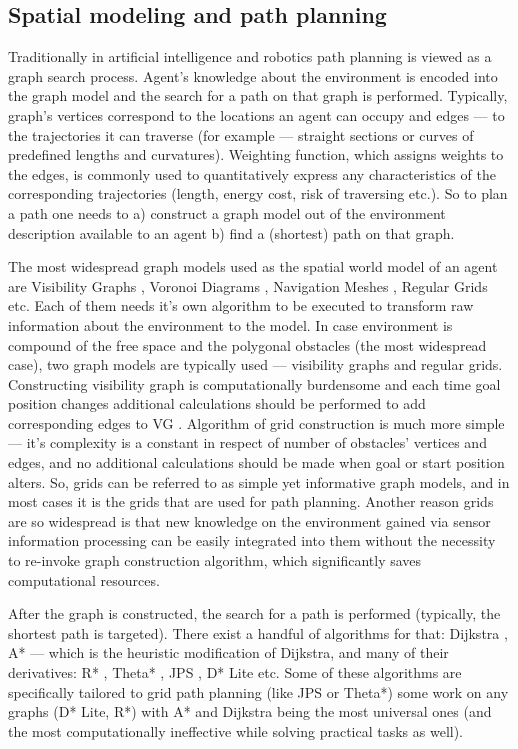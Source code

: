\documentclass[runningheads,a4paper]{llncs}
\begin{document}
\subsection{Spatial modeling and path planning}

Traditionally in artificial intelligence and robotics path planning is viewed as a graph search process. Agent's knowledge about the environment is encoded into the graph model and the search for a path on that graph is performed. Typically, graph's vertices correspond to the locations an agent can occupy and edges --- to the trajectories it can traverse (for example --- straight sections or curves of predefined lengths and curvatures). Weighting function, which assigns weights to the edges, is commonly used to quantitatively express any characteristics of the corresponding trajectories (length, energy cost, risk of traversing etc.). So to plan a path one needs to a) construct a graph model out of the environment description available to an agent b) find a (shortest) path on that graph.

The most widespread graph models used as the spatial world model of an agent are Visibility Graphs \cite{Lozano1979}, Voronoi Diagrams \cite{Bhattacharya2008}, Navigation Meshes \cite{Kallmann2010}, Regular Grids \cite{Yap2002} etc. Each of them needs it's own algorithm to be executed to transform raw information about the environment to the model. In case environment is compound of the free space and the polygonal obstacles (the most widespread case), two graph models are typically used --- visibility graphs and regular grids. Constructing visibility graph is computationally burdensome and each time goal position changes additional calculations should be performed to add corresponding edges to VG \cite{Wooden2006}. Algorithm of grid construction is much more simple --- it's complexity is a constant in respect of number of obstacles' vertices and edges, and no additional calculations should be made when goal or start position alters. So, grids can be referred to as simple yet informative graph models, and in most cases it is the grids that are used for path planning. Another reason grids are so widespread is that new knowledge on the environment gained via sensor information processing can be easily integrated into them \cite{Elfes1989} without the necessity to re-invoke graph construction algorithm, which significantly saves computational resources.

After the graph is constructed, the search for a path is performed (typically, the shortest path is targeted). There exist a handful of algorithms for that: Dijkstra \cite{Dijkstra1959}, A* \cite{Hart1968} --- which is the heuristic modification of Dijkstra, and many of their derivatives: R* \cite{Likhachev2008}, Theta* \cite{Nash2007}, JPS \cite{Harabor2011}, D* Lite \cite{Koenig2000} etc. Some of these algorithms are specifically tailored to grid path planning (like JPS or Theta*) some work on any graphs (D* Lite, R*) with A* and Dijkstra being the most universal ones (and the most computationally ineffective while solving practical tasks as well).
\end{document}
